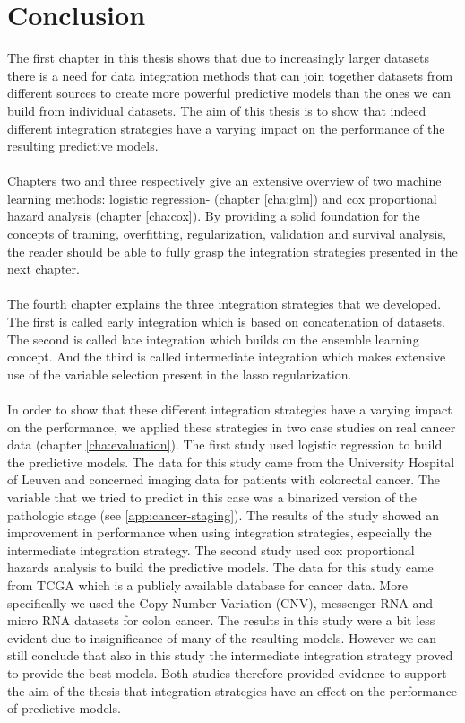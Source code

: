 \chapter{Conclusion}
\label{cha:conclusion}
The first chapter in this thesis shows that due to increasingly larger datasets there is a need for data integration methods that can join together datasets from different sources to create more powerful predictive models than the ones we can build from individual datasets. The aim of this thesis is to show that indeed different integration strategies have a varying impact on the performance of the resulting predictive models. \\ \\
Chapters two and three respectively give an extensive overview of two machine learning methods: logistic regression- (chapter \ref{cha:glm}) and cox proportional hazard analysis (chapter \ref{cha:cox}). By providing a solid foundation for the concepts of training, overfitting, regularization, validation and survival analysis, the reader should be able to fully grasp the integration strategies presented in the next chapter. \\ \\
The fourth chapter explains the three integration strategies that we developed. The first is called early integration which is based on concatenation of datasets. The second is called late integration which builds on the ensemble learning concept. And the third is called intermediate integration which makes extensive use of the variable selection present in the lasso regularization. \\ \\
In order to show that these different integration strategies have a varying impact on the performance, we applied these strategies in two case studies on real cancer data (chapter \ref{cha:evaluation}). The first study used logistic regression to build the predictive models. The data for this study came from the University Hospital of Leuven and concerned imaging data for patients with colorectal cancer. The variable that we tried to predict in this case was a binarized version of the pathologic stage (see \ref{app:cancer-staging}). The results of the study showed an improvement in performance when using integration strategies, especially the intermediate integration strategy. The second study used cox proportional hazards analysis to build the predictive models. The data for this study came from TCGA which is a publicly available database for cancer data. More specifically we used the Copy Number Variation (CNV), messenger RNA and micro RNA datasets for colon cancer. The results in this study were a bit less evident due to insignificance of many of the resulting models. However we can still conclude that also in this study the intermediate integration strategy proved to provide the best models. Both studies therefore provided evidence to support the aim of the thesis that integration strategies have an effect on the performance of predictive models. \\ \\
